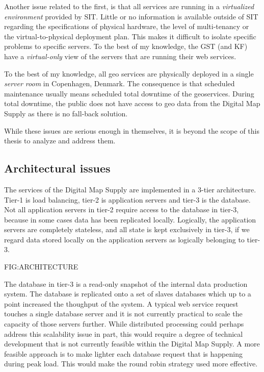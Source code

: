 Another issue related to the first, is that all services are running in a \emph{virtualized environment} provided by SIT. Little or no information is available outside of SIT regarding the specifications of physical hardware, the level of multi-tenancy or the virtual-to-physical deployment plan. This makes it difficult to isolate specific problems to specific servers. To the best of my knowledge, the GST (and KF) have a \emph{virtual-only} view of the servers that are running their web services.

To the best of my knowledge, all geo services are physically deployed in a single \emph{server room} in Copenhagen, Denmark. The consequence is that scheduled maintenance usually means scheduled total downtime of the geoservices. During total downtime, the public does not have access to geo data from the Digital Map Supply as there is no fall-back solution.

While these issues are serious enough in themselves, it is beyond the scope of this thesis to analyze and address them.

\subsection{Architectural issues}
The services of the Digital Map Supply are implemented in a 3-tier architecture. Tier-1 is load balancing, tier-2 is application servers and tier-3 is the database. Not all application servers in tier-2 require access to the database in tier-3, because in some cases data has been replicated locally. Logically, the application servers are completely stateless, and all state is kept exclusively in tier-3, if we regard data stored locally on the application servers as logically belonging to tier-3. 

FIG:ARCHITECTURE

The database in tier-3 is a read-only snapshot of the internal data production system. The database is replicated onto a set of slaves databases which up to a point increased the thoughput of the system. A typical web service request touches a single database server and it is not currently practical to scale the capacity of those servers further. While distributed processing could perhaps address this scalability issue in part, this would require a degree of technical development that is not currently feasible within the Digital Map Supply. A more feasible approach is to make lighter each database request that is happening during peak load. This would make the round robin strategy used more effective.

